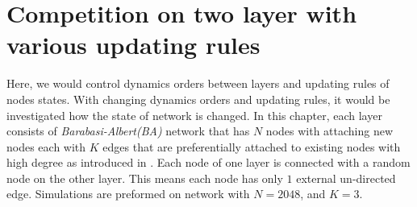 
\chapter{Competition on two layer with various updating rules}
\label{chap:competition on two layer with different updating rules}
Here, we would control dynamics orders between layers and updating rules of nodes states. With changing dynamics orders and updating rules, it would be investigated how the state of network is changed.
In this chapter, each layer consists of \textit{Barabasi-Albert(BA)} network that has $N$ nodes with attaching new nodes each with $K$ edges that are preferentially attached to existing nodes with high degree as introduced in \parencite{barabasi1999}. Each node of one layer is connected with a random node on the other layer. This means each node has only $1$ external un-directed edge. Simulations are preformed on network with $N=2048$, and $K = 3$.

